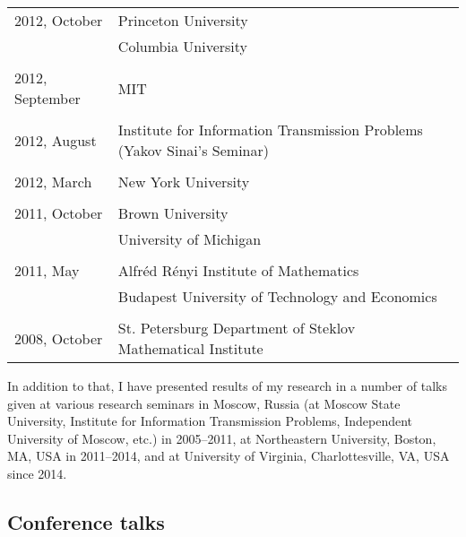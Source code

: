 \documentclass[letterpaper,11pt]{article}
\begin{document}
\begin{longtable}{llc}
	2012, October & Princeton University \\
	& Columbia University\\\\

	2012, September & MIT \\\\

	2012, August
	& Institute for Information Transmission Problems
	(Yakov Sinai's Seminar)
	\\\\

	2012, March & New York University\\\\

	2011, October & Brown University \\
	&University of Michigan
	\\
	\\
	2011, May& Alfr\'ed R\'enyi Institute of Mathematics
	\\
	& Budapest University of Technology and Economics
	\\\\

	2008, October &
	St. Petersburg Department of Steklov Mathematical
	Institute%
	\\
\end{longtable}
\bigskip

In addition to that, I have presented results of my research in a number of
talks given at various research seminars in Moscow, Russia (at Moscow State
University, Institute for Information Transmission Problems, Independent
University of Moscow, etc.) in 2005--2011, at Northeastern University, Boston,
MA, USA in 2011--2014, and at University of Virginia, Charlottesville, VA, USA
since 2014.

\subsection*{Conference talks}
\end{document}
